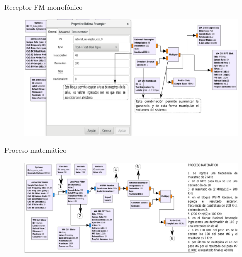 \begin{frame}{Receptor FM monofónico}

\begin{figure}[H]
\centering
\vspace{-3mm}
\includegraphics[width=\textwidth]{parte3/lab8/pdf/lab8_6.pdf}
\end{figure}

\end{frame}

\begin{frame}{Proceso matemático}

\begin{figure}[H]
\centering
\vspace{-3mm}
\includegraphics[width=\textwidth]{parte3/lab8/pdf/lab8_7.pdf}
\end{figure}

\end{frame}

